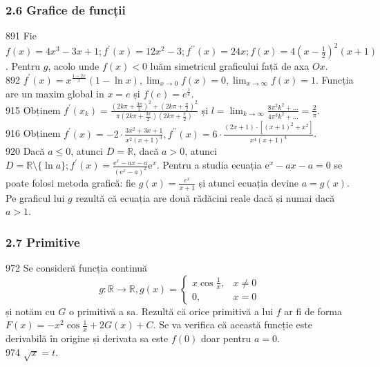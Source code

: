 \documentclass[11pt]{article}
\begin{document}
\subsubsection*{2.6 Grafice de funcții}
891 Fie $f(x)=4 x^{3}-3 x+1 ; f^{\prime}(x)=12 x^{2}-3 ; f^{\prime \prime}(x)=24 x ; f(x)=4\left(x-\frac{1}{2}\right)^{2}(x+1)$. Pentru $g$, acolo unde $f(x)<0$ luăm simetricul graficului față de axa $O x$.\\
892 $f^{\prime}(x)=x^{\frac{1-2 x}{x}}(1-\ln x), \lim _{x \rightarrow 0} f(x)=0, \lim _{x \rightarrow \infty} f(x)=1$. Funcția are un maxim global in $x=e$ și $f(e)=e^{\frac{1}{e}}$.\\
915 Obținem $f^{\prime}\left(x_{k}\right)=\frac{\left(2 k \pi+\frac{3 \pi}{2}\right)^{2}+\left(2 k \pi+\frac{\pi}{2}\right)^{2}}{\pi\left(2 k \pi+\frac{3 \pi}{2}\right)\left(2 k \pi+\frac{\pi}{2}\right)}$ și $\left.l=\lim _{k \rightarrow \infty} \frac{8 \pi^{2} k^{2}+\ldots}{4 \pi^{3} k^{2}+\ldots}=\frac{2}{\pi}\right.$.\\
916 Obținem $f^{\prime}(x)=-2 \cdot \frac{3 x^{2}+3 x+1}{x^{2}(x+1)^{3}}, f^{\prime \prime}(x)=6 \cdot \frac{(2 x+1) \cdot\left[(x+1)^{2}+x^{2}\right]}{x^{4}(x+1)^{4}}$.\\
920 Dacă $a \leq 0$, atunci $D=\mathbb{R}$, dacă $a>0$, atunci $D=\mathbb{R} \setminus\{\ln a\} ; f^{\prime}(x)=\frac{\mathrm{e}^{x}-a x-a}{\left(\mathrm{e}^{x}-a\right)^{2}} \mathrm{e}^{x}$. Pentru a studia ecuația $\mathrm{e}^{x}-a x-a=0$ se poate folosi metoda grafică: fie $g(x)=\frac{e^{x}}{x+1}$ și atunci ecuația devine $a=g(x)$. Pe graficul lui $g$ rezultă că ecuația are două rădăcini reale dacă și numai dacă $a>1$.\\

\subsubsection*{2.7 Primitive}
972 Se consideră funcția continuă $$g: \mathbb{R} \rightarrow \mathbb{R}, g(x)= \begin{cases}x \cos \frac{1}{x}, & x \neq 0 \\ 0, & x=0\end{cases}$$ și notăm cu $G$ o primitivă a sa. Rezultă că orice primitivă a lui $f$ ar fi de forma $F(x)=-x^{2} \cos \frac{1}{x}+2 G(x)+C$. Se va verifica că această funcție este derivabilă în origine și derivata sa este $f(0)$ doar pentru $a=0$.\\
974 $\sqrt{x}=t$.\\
\end{document}
